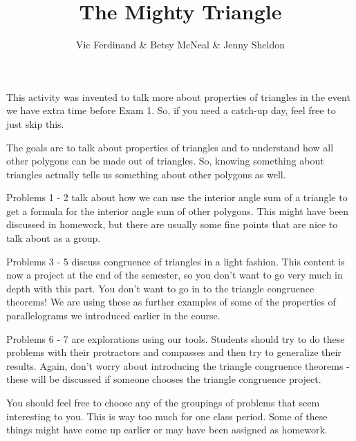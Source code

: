 \documentclass[nooutcomes]{ximera}
\title{The Mighty Triangle}
\author{Vic Ferdinand \& Betsy McNeal \& Jenny Sheldon}
\begin{document}
\begin{abstract}
\end{abstract}
\maketitle

\begin{instructorIntro}
This activity was invented to talk more about properties of triangles in the event we have extra time before Exam 1.  So, if you need a catch-up day, feel free to just skip this.

The goals are to talk about properties of triangles and to understand how all other polygons can be made out of triangles.  So, knowing something about triangles actually tells us something about other polygons as well.

Problems 1 - 2 talk about how we can use the interior angle sum of a triangle to get a formula for the interior angle sum of other polygons.  This might have been discussed in homework, but there are usually some fine points that are nice to talk about as a group.

Problems 3 - 5 discuss congruence of triangles in a light fashion.  This content is now a project at the end of the semester, so you don't want to go very much in depth with this part.  You don't want to go in to the triangle congruence theorems!  We are using these as further examples of some of the properties of parallelograms we introduced earlier in the course.

Problems 6 - 7 are explorations using our tools.  Students should try to do these problems with their protractors and compasses and then try to generalize their results.  Again, don't worry about introducing the triangle congruence theorems - these will be discussed if someone chooses the triangle congruence project.

You should feel free to choose any of the groupings of problems that seem interesting to you.  This is way too much for one class period.  Some of these things might have come up earlier or may have been assigned as homework.

\end{instructorIntro}
\end{document}
